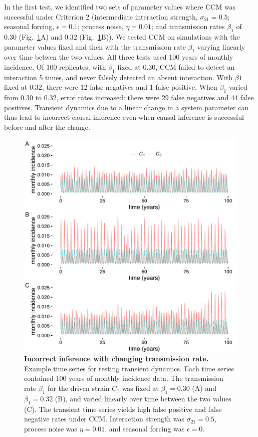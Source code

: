 In the first test, we identified two sets of parameter values where CCM was successful under Criterion 2 (intermediate interaction strength, $\sigma_{21} = 0.5$; seasonal forcing, $\epsilon = 0.1$; process noise, $\eta = 0.01$; and transmission rates $\beta_1$ of $0.30$ (Fig.~\ref{fig:betachange}A) and $0.32$ (Fig.~\ref{fig:betachange}B)).
We tested CCM on simulations with the parameter values fixed and then with the transmission rate $\beta_1$ varying linearly over time betwen the two values.
All three tests used 100 years of monthly incidence.
Of 100 replicates, with $\beta_1$ fixed at $0.30$, CCM failed to detect an interaction 5 times, and never falsely detected an absent interaction.
With $\beta1$ fixed at $0.32$, there were 12 false negatives and 1 false positive.
When $\beta_1$ varied from $0.30$ to $0.32$, error rates increased: there were 29 false negatives and 44 false positives.
Transient dynamics due to a linear change in a system parameter can thus lead to incorrect causal inference even when causal inference is successful before and after the change.

\begin{figure}
    \begin{center}
      \includegraphics[width=6in]{dataflow/out/fig_betachange/fig_betachange.pdf}
    \end{center}
    \caption{\textbf{Incorrect inference with changing transmission rate.} Example time series for testing transient dynamics. Each time series contained 100 years of monthly incidence data. The transmission rate $\beta_1$ for the driven strain $C_1$ was fixed at $\beta_1 = 0.30$ (A) and $\beta_1 = 0.32$ (B), and varied linearly over time between the two values (C). The transient time series yields high false positive and false negative rates under CCM. Interaction strength was $\sigma_{21} = 0.5$, process noise was $\eta = 0.01$, and seasonal forcing was $\epsilon = 0$. \label{fig:betachange}} 
\end{figure}

